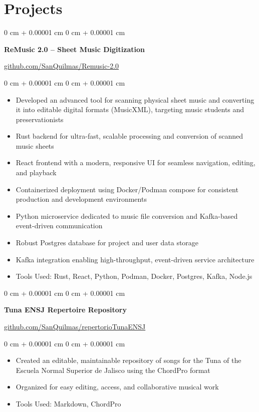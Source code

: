 \documentclass[10pt, letterpaper]{article}
\newenvironment{highlights}{
  \begin{itemize}[
        topsep=0.10 cm,
        parsep=0.10 cm,
        partopsep=0pt,
        itemsep=0pt,
        leftmargin=0 cm + 10pt
      ]
    }{
  \end{itemize}
} %
\newenvironment{onecolentry}{
  \begin{adjustwidth}{
      0 cm + 0.00001 cm
    }{
      0 cm + 0.00001 cm
    }
  }{
  \end{adjustwidth}
} %
\begin{document}
\section{Projects}
\begin{onecolentry}
  \textbf{ReMusic 2.0 – Sheet Music Digitization}
\end{onecolentry}
\vspace{0.05 cm}
\href{https://github.com/SanQuilmas/Remusic-2.0}{github.com/SanQuilmas/Remusic-2.0}
\vspace{0.10 cm}
\begin{onecolentry}
  \begin{highlights}
    \item Developed an advanced tool for scanning physical sheet music and converting it into editable digital formats (MusicXML), targeting music students and preservationists
    \item Rust backend for ultra-fast, scalable processing and conversion of scanned music sheets
    \item React frontend with a modern, responsive UI for seamless navigation, editing, and playback
    \item Containerized deployment using Docker/Podman compose for consistent production and development environments
    \item Python microservice dedicated to music file conversion and Kafka-based event-driven communication
    \item Robust Postgres database for project and user data storage
    \item Kafka integration enabling high-throughput, event-driven service architecture
    \item Tools Used: Rust, React, Python, Podman, Docker, Postgres, Kafka, Node.js
  \end{highlights}
\end{onecolentry}
\vspace{0.2 cm}
\begin{onecolentry}
  \textbf{Tuna ENSJ Repertoire Repository}
\end{onecolentry}
\vspace{0.05 cm}
\href{https://github.com/SanQuilmas/repertorioTunaENSJ}{github.com/SanQuilmas/repertorioTunaENSJ}
\vspace{0.10 cm}
\begin{onecolentry}
  \begin{highlights}
    \item Created an editable, maintainable repository of songs for the Tuna of the Escuela Normal Superior de Jalisco using the ChordPro format
    \item Organized for easy editing, access, and collaborative musical work
    \item Tools Used: Markdown, ChordPro
  \end{highlights}
\end{onecolentry}
\end{document}
